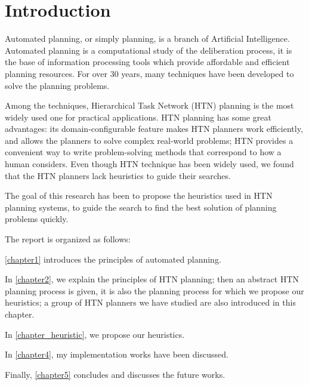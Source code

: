 \chapter{Introduction}
Automated planning, or simply planning, is a branch of Artificial Intelligence. Automated planning is a computational study of the deliberation process, it is the base of information processing tools which provide affordable and efficient planning resources. For over 30 years, many techniques have been developed to solve the planning problems.

Among the techniques, Hierarchical Task Network (HTN) planning is the most widely used one for practical applications. HTN planning has some great advantages: its domain-configurable feature makes HTN planners work efficiently, and allows the planners to solve complex real-world problems; HTN provides a convenient way to write problem-solving methods that correspond to how a human considers. Even though HTN technique has been widely used, we found that the HTN planners lack heuristics to guide their searches.

The goal of this research has been to propose the heuristics used in HTN planning systems, to guide the search to find the best solution of planning problems quickly.


The report is organized as follows:

\autoref{chapter1} introduces the principles of automated planning. 

In \autoref{chapter2}, we explain the principles of HTN planning; then an abstract HTN planning process is given, it is also the planning process for which we propose our heuristics; a group of HTN planners we have studied are also introduced in this chapter.

In \autoref{chapter_heuristic}, we propose our heuristics.

In \autoref{chapter4}, my implementation works have been discussed.

Finally, \autoref{chapter5} concludes and discusses the future works.